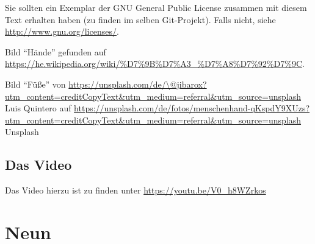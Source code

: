 \documentclass[a4paper]{amsart}
\theoremstyle{definition}
\begin{document}
Sie sollten ein Exemplar der GNU General Public License zusammen mit diesem Text erhalten haben 
(zu finden im selben Git-Projekt). 
Falls nicht, siehe \url{http://www.gnu.org/licenses/}.

Bild "`Hände"' gefunden auf \url{https://he.wikipedia.org/wiki/%D7%9B%D7%A3_%D7%A8%D7%92%D7%9C}.

Bild "`Füße"' von \url{https://unsplash.com/de/\@jibarox?utm_content=creditCopyText\&utm_medium=referral\&utm_source=unsplash} Luis Quintero auf \url{https://unsplash.com/de/fotos/menschenhand-qKspdY9XUzs?utm\_content=creditCopyText\&utm_medium=referral\&utm\_source=unsplash} Unsplash

\subsection*{Das Video}
Das Video hierzu ist zu finden unter \url{https://youtu.be/V0_h8WZrkos}

\section{Neun}
\def\kategoryVspace{5pt}

\end{document}
